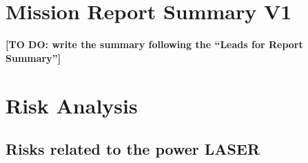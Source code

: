 \documentclass[11pt,a4paper]{article}
\newcommand{\todo}[1]{\textbf{[TO DO: #1]}}
\begin{document}
\section{Mission Report Summary V1}
\todo{write the summary following the ``Leads for Report Summary''}

\section{Risk Analysis}

\subsection{Risks related to the power LASER}
\end{document}
